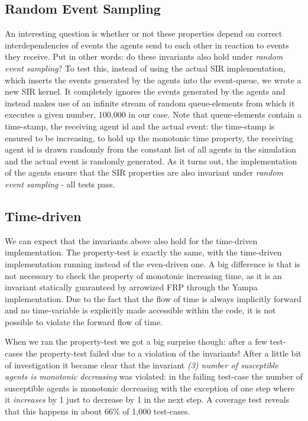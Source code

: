 \subsection{Random Event Sampling}
An interesting question is whether or not these properties depend on correct interdependencies of events the agents send to each other in reaction to events they receive. Put in other words: do these invariants also hold under \textit{random event sampling}? To test this, instead of using the actual SIR implementation, which inserts the events generated by the agents into the event-queue, we wrote a new SIR kernel. It completely ignores the events generated by the agents and instead makes use of an infinite stream of random queue-elements from which it executes a given number, 100,000 in our case. Note that queue-elements contain a time-stamp, the receiving agent id and the actual event: the time-stamp is ensured to be increasing, to hold up the monotonic time property, the receiving agent id is drawn randomly from the constant list of all agents in the simulation and the actual event is randomly generated. As it turns out, the implementation of the agents ensure that the SIR properties are also invariant under \textit{random event sampling} - all tests pass.

\subsection{Time-driven}
We can expect that the invariants above also hold for the time-driven implementation. The property-test is exactly the same, with the time-driven implementation running instead of the even-driven one. A big difference is that is not necessary to check the property of monotonic increasing time, as it is an invariant statically guaranteed by arrowized FRP through the Yampa implementation. Due to the fact that the flow of time is always implicitly forward and no time-variable is explicitly made accessible within the code, it is not possible to violate the forward flow of time.

When we ran the property-test we got a big surprise though: after a few test-cases the property-test failed due to a violation of the invariants! After a little bit of investigation it became clear that the invariant \textit{(3) number of susceptible agents is monotonic decreasing} was violated: in the failing test-case the number of susceptible agents is monotonic decreasing with the exception of one step where it \textit{increases} by 1 just to decrease by 1 in the next step. A coverage test reveals that this happens in about 66\% of 1,000 test-cases.

